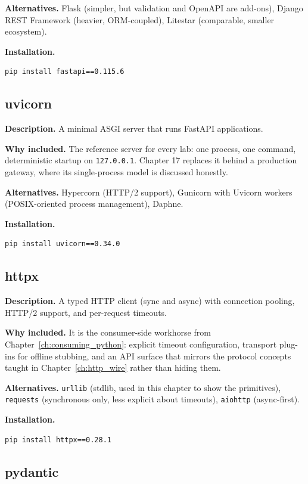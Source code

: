 \textbf{Alternatives.} Flask (simpler, but validation and OpenAPI are
add-ons), Django REST Framework (heavier, ORM-coupled), Litestar (comparable,
smaller ecosystem).

\textbf{Installation.}
\begin{verbatim}
pip install fastapi==0.115.6
\end{verbatim}

\subsection{uvicorn}

\textbf{Description.} A minimal ASGI server that runs FastAPI applications.

\textbf{Why included.} The reference server for every lab: one process, one
command, deterministic startup on \texttt{127.0.0.1}. Chapter 17 replaces it
behind a production gateway, where its single-process model is discussed
honestly.

\textbf{Alternatives.} Hypercorn (HTTP/2 support), Gunicorn with Uvicorn
workers (POSIX-oriented process management), Daphne.

\textbf{Installation.}
\begin{verbatim}
pip install uvicorn==0.34.0
\end{verbatim}

\subsection{httpx}

\textbf{Description.} A typed HTTP client (sync and async) with connection
pooling, HTTP/2 support, and per-request timeouts.

\textbf{Why included.} It is the consumer-side workhorse from
Chapter~\ref{ch:consuming_python}: explicit timeout configuration, transport
plug-ins for offline stubbing, and an API surface that mirrors the protocol
concepts taught in Chapter~\ref{ch:http_wire} rather than hiding them.

\textbf{Alternatives.} \texttt{urllib} (stdlib, used in this chapter to show
the primitives), \texttt{requests} (synchronous only, less explicit about
timeouts), \texttt{aiohttp} (async-first).

\textbf{Installation.}
\begin{verbatim}
pip install httpx==0.28.1
\end{verbatim}

\subsection{pydantic}

